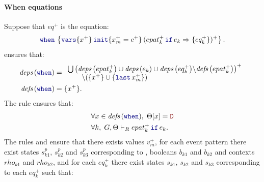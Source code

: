 \begin{skippableproof}
    \paragraph{When equations}
    Suppose that $eq^+$ is the  equation:
    \begin{equation*}
        \when{x^+}{x_m^+ = c^+}{(\branch{epat_k^+}{e_k}{eq_k^+})^+}.
    \end{equation*}
     ensures that:
    \begin{align*}
        \deps{\kwf{when}} & =
        \begin{array}{l}
            \bigcup \left(\deps{epat_k^+} \cup \deps{e_k} \cup \deps{eq_k^+} \backslash \defs{epat_k^+}\right)^+ \\
            \qquad \backslash (\{x^+\} \cup \{\last{x_m}^+\})
        \end{array} \\
        \defs{\kwf{when}} & = \{x^+\}.
    \end{align*}
    The rule  ensures that:
    \begin{align*}
         & \forall x \in \defs{\kwf{when}}, \; \Theta[x] = \dType          \\
         & \forall k, \; \epatTypedReact{\Theta}{\guarded{epat_k^+}{e_k}}.
    \end{align*}
    The rules  and
     ensure that there exists values
    $v_m^+$, for each event pattern  there exist states $s^p_{k1}$,
    $s^p_{k2}$ and $s^p_{k3}$ corresponding to , booleans $b_{k1}$
    and $b_{k2}$ and contexts $rho_{k1}$ and $rho_{k2}$, and for each $eq_k^+$ there exist
    states $s_{k1}$, $s_{k2}$ and $s_{k3}$ corresponding to each $eq_k^+$ such that:
    \\\noindent{}
\end{skippableproof}
